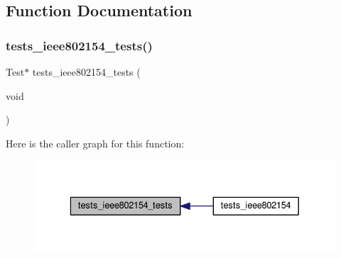 \subsection{Function Documentation}
\mbox{\label{tests-ieee802154_8c_a13102a54316da9c2a4e04e50aee78196}} 
\subsubsection{\texorpdfstring{tests\+\_\+ieee802154\+\_\+tests()}{tests\_ieee802154\_tests()}}
{\footnotesize\ttfamily Test$\ast$ tests\+\_\+ieee802154\+\_\+tests (\begin{DoxyParamCaption}\item[{void}]{ }\end{DoxyParamCaption})}

Here is the caller graph for this function\+:
\nopagebreak
\begin{figure}[H]
\begin{center}
\leavevmode
\includegraphics[width=329pt]{tests-ieee802154_8c_a13102a54316da9c2a4e04e50aee78196_icgraph}
\end{center}
\end{figure}
